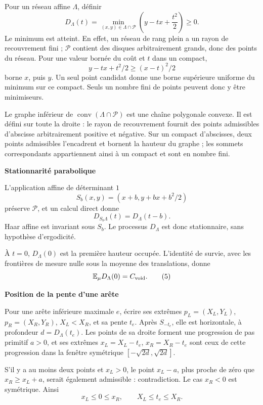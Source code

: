 \documentclass[11pt,a4paper]{article}
\newcommand{\E}{\mathbb E}\newcommand{\Prb}{\mathbb P}
\newcommand{\head}[1]{\vspace{3pt}{\large\bfseries\color{navy}#1}\par}
\newcommand{\subhead}[1]{{\bfseries\color{navy}#1}\par}
\begin{document}
\newpage
\head{2. Déficit de support et chaîne inférieure}
Pour un réseau affine $\Lambda$, définir
\[
 D_\Lambda(t)=\min_{(x,y)\in\Lambda\cap\mathcal P}
       \left(y-tx+\frac{t^2}{2}\right)\ge0.
 \tag{3}
\]
Le minimum est atteint. En effet, un réseau de rang plein a un rayon de recouvrement fini ; $\mathcal P$ contient des disques arbitrairement grands, donc des points du réseau. Pour une valeur bornée du coût et $t$ dans un compact,
\[
 y-tx+t^2/2\ge (x-t)^2/2
\]
borne $x$, puis $y$. Un seul point candidat donne une borne supérieure uniforme du minimum sur ce compact. Seuls un nombre fini de points peuvent donc y être minimiseurs.

Le graphe inférieur de $\operatorname{conv}(\Lambda\cap\mathcal P)$ est une chaîne polygonale convexe. Il est défini sur toute la droite : le rayon de recouvrement fournit des points admissibles d'abscisse arbitrairement positive et négative. Sur un compact d'abscisses, deux points admissibles l'encadrent et bornent la hauteur du graphe ; les sommets correspondants appartiennent ainsi à un compact et sont en nombre fini.

\subhead{Stationnarité parabolique}
L'application affine de déterminant $1$
\[
 S_b(x,y)=(x+b,y+bx+b^2/2)
\]
préserve $\mathcal P$, et un calcul direct donne
\[
 D_{S_b\Lambda}(t)=D_\Lambda(t-b).
 \tag{4}
\]
Haar affine est invariant sous $S_b$. Le processus $D_\Lambda$ est donc stationnaire, sans hypothèse d'ergodicité.

À $t=0$, $D_\Lambda(0)$ est la première hauteur occupée. L'identité de survie, avec les frontières de mesure nulle sous la moyenne des translations, donne
\[
 \E_\mu D_\Lambda(0)=C_{\rm void}.
 \tag{5}
\]

\subhead{Position de la pente d'une arête}
Pour une arête inférieure maximale $e$, écrire ses extrêmes $p_L=(X_L,Y_L)$, $p_R=(X_R,Y_R)$, $X_L<X_R$, et sa pente $t_e$. Après $S_{-t_e}$, elle est horizontale, à profondeur $d=D_\Lambda(t_e)$. Les points de sa droite forment une progression de pas primitif $a>0$, et ses extrêmes $x_L=X_L-t_e$, $x_R=X_R-t_e$ sont ceux de cette progression dans la fenêtre symétrique $[-\sqrt{2d},\sqrt{2d}]$.

S'il y a au moins deux points et $x_L>0$, le point $x_L-a$, plus proche de zéro que $x_R\ge x_L+a$, serait également admissible : contradiction. Le cas $x_R<0$ est symétrique. Ainsi
\[
 x_L\le0\le x_R,\qquad X_L\le t_e\le X_R.
 \tag{6}
\]
\end{document}
